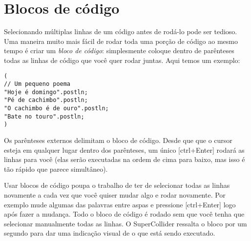 \section{Blocos de código}
\label{sec:code-block}


Selecionando múltiplas linhas de um código antes de rodá-lo pode ser tedioso. Uma maneira muito mais fácil de rodar toda uma porção de código ao mesmo tempo é criar um \textit{bloco de código}: simplesmente coloque dentro de parênteses todas as linhas de código que você quer rodar juntas. Aqui temos um exemplo:


\begin{lstlisting}[style=SuperCollider-IDE, basicstyle=\scttfamily\footnotesize]
(
// Um pequeno poema
"Hoje é domingo".postln;
"Pé de cachimbo".postln;
"O cachimbo é de ouro".postln;
"Bate no touro".postln;
)
\end{lstlisting}

Os parênteses externos delimitam o bloco de código. Desde que que o cursor esteja em qualquer lugar dentro dos parênteses, um único [ctrl+Enter] rodará as linhas para você (elas serão executadas na ordem de cima para baixo, mas isso é tão rápido que parece simultâneo).

Usar blocos de código poupa o trabalho de ter de selecionar todas as linhas novamente a cada vez que você quiser mudar algo e rodar novamente. Por exemplo mude algumas das palavras entre aspas e pressione [ctrl+Enter] logo após fazer a mudança. Todo o bloco de código é rodado sem que você tenha que selecionar manualmente todas as linhas. O SuperCollider ressalta o bloco por um segundo para dar uma indicação visual de o que está sendo executado.
